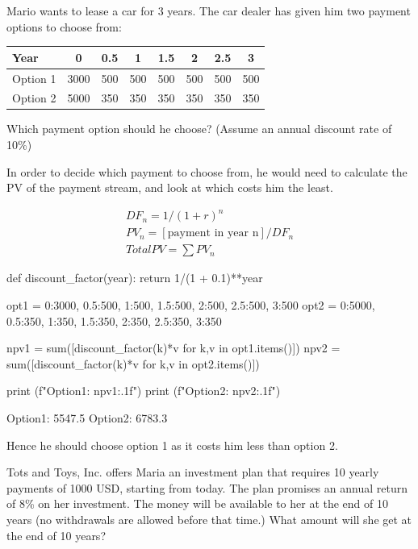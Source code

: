 \cprotEnv\begin{question}
Mario wants to lease a car for 3 years. The car dealer has given him two payment options to choose from:
\begin{table}[htbp]	
    \centering	
	\begin{tabular}{l|c|c|c|c|c|c|c}
		Year & 0 & 0.5 & 1 & 1.5 & 2 & 2.5 & 3 \\
		\hline
		Option 1 &	3000	& 500 & 500 &	500 & 500 & 500 & 500 \\
		\hline
		Option 2 &	5000	& 350 & 350 &	350 & 350 & 350 & 350 \\
	\end{tabular}
\end{table}

\noindent
Which payment option should he choose? (Assume an annual discount rate of 10\%)
\end{question}

\cprotEnv\begin{solution}
In order to decide which payment to choose from, he would need to calculate the PV of the payment stream, and look at which costs him the least. 
	
\begin{gather*}
DF_n = 1/(1 + r)^n \\
PV_n = [\textrm{payment in year n}] / DF_n \\
Total PV = \sum PV_n
\end{gather*}
	
\begin{ipython}
def discount_factor(year):
	return 1/(1 + 0.1)**year
		
opt1 = {0:3000, 0.5:500, 1:500, 1.5:500, 2:500, 2.5:500, 3:500}
opt2 = {0:5000, 0.5:350, 1:350, 1.5:350, 2:350, 2.5:350, 3:350}
		
npv1 = sum([discount_factor(k)*v for k,v in opt1.items()])
npv2 = sum([discount_factor(k)*v for k,v in opt2.items()])
		
print (f"Option1: {npv1:.1f}")
print (f"Option2: {npv2:.1f}")
\end{ipython}
\begin{ioutput}
Option1: 5547.5
Option2: 6783.3
\end{ioutput}
Hence he should choose option 1 as it costs him less than option 2.
\end{solution}

\begin{question}
Tots and Toys, Inc. offers Maria an investment plan that requires 10 yearly payments of 1000 USD, starting from today. The plan promises an annual return of 8\% on her investment. The money will be available to her at the end of 10 years (no withdrawals are allowed before that time.) 
What amount will she get at the end of 10 years?
\end{question}

